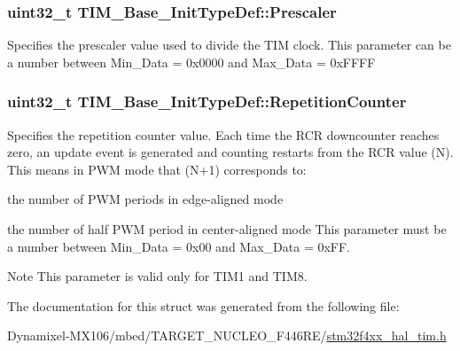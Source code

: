 \subsubsection[{\texorpdfstring{Prescaler}{Prescaler}}]{\setlength{\rightskip}{0pt plus 5cm}uint32\+\_\+t T\+I\+M\+\_\+\+Base\+\_\+\+Init\+Type\+Def\+::\+Prescaler}\hypertarget{struct_t_i_m___base___init_type_def_afc886119e6709bb576d25b5cf8d12d92}{}\label{struct_t_i_m___base___init_type_def_afc886119e6709bb576d25b5cf8d12d92}
Specifies the prescaler value used to divide the T\+IM clock. This parameter can be a number between Min\+\_\+\+Data = 0x0000 and Max\+\_\+\+Data = 0x\+F\+F\+FF 
\subsubsection[{\texorpdfstring{Repetition\+Counter}{RepetitionCounter}}]{\setlength{\rightskip}{0pt plus 5cm}uint32\+\_\+t T\+I\+M\+\_\+\+Base\+\_\+\+Init\+Type\+Def\+::\+Repetition\+Counter}\hypertarget{struct_t_i_m___base___init_type_def_aa949328175500fd1d112f64a4db5ae79}{}\label{struct_t_i_m___base___init_type_def_aa949328175500fd1d112f64a4db5ae79}
Specifies the repetition counter value. Each time the R\+CR downcounter reaches zero, an update event is generated and counting restarts from the R\+CR value (N). This means in P\+WM mode that (N+1) corresponds to\+:
\begin{DoxyItemize}
\item the number of P\+WM periods in edge-\/aligned mode
\item the number of half P\+WM period in center-\/aligned mode This parameter must be a number between Min\+\_\+\+Data = 0x00 and Max\+\_\+\+Data = 0x\+FF. \begin{DoxyNote}{Note}
This parameter is valid only for T\+I\+M1 and T\+I\+M8. 
\end{DoxyNote}

\end{DoxyItemize}

The documentation for this struct was generated from the following file\+:\begin{DoxyCompactItemize}
\item 
Dynamixel-\/\+M\+X106/mbed/\+T\+A\+R\+G\+E\+T\+\_\+\+N\+U\+C\+L\+E\+O\+\_\+\+F446\+R\+E/\hyperlink{stm32f4xx__hal__tim_8h}{stm32f4xx\+\_\+hal\+\_\+tim.\+h}\end{DoxyCompactItemize}
